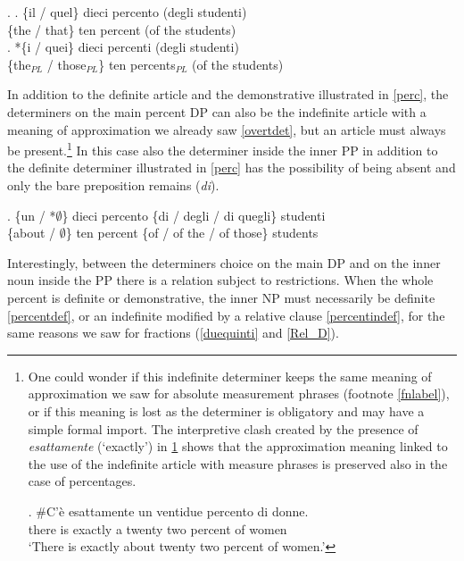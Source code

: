 \documentclass[charis, linguex]{glossa}
\begin{document}
\ex. \label{percnoagree} \ag. \{il / quel\} dieci percento (degli studenti) \\
      \{the / that\} ten percent ({of the} students) \\ \label{perc}
    \bg. *\{i / quei\} dieci percenti (degli studenti) \\
       \{the$_{PL}$ / those$_{PL}$\}  ten percents$_{PL}$ ({of the} students) \\ \label{noagree}
	   
In addition to the definite article and the demonstrative illustrated in \ref{perc}, the determiners on the main percent DP can also be the indefinite article with a meaning of approximation we already saw \ref{overtdet}, but an article must always be present.\footnote{One could wonder if this indefinite determiner keeps the same meaning of approximation we saw for absolute measurement phrases (footnote \ref{fnlabel}), or if this meaning is lost as the determiner is obligatory and may have a simple formal import.  The interpretive clash created by the presence of \textit{esattamente} (`exactly') in \ref{ventidue} shows that the approximation meaning linked to the use of the indefinite article with measure phrases is preserved also in the case of percentages. 

\exg. \#C'\`{e} esattamente un ventidue percento di donne.\\
         {there is} exactly a {twenty two} percent of women\\ \label{ventidue}
 \glt `There is exactly about twenty two percent of women.'
	
	} In this case also the determiner inside the inner PP in addition to the definite determiner illustrated in \ref{perc} has the possibility of being absent and only the bare preposition remains (\textit{di}). 

\exg. \{un / *$\emptyset$\} dieci percento \{di / degli / di quegli\} studenti \\
      \{about / $\emptyset$\}  ten   percent  \{of / {of the} / of those\} students \\ \label{overtdet}



Interestingly, between the determiners choice on the main DP and on the inner noun inside the PP there is a relation subject to restrictions. When the whole percent is definite or demonstrative, the inner NP must necessarily be definite \ref{percentdef}, or an indefinite modified by a relative clause  \ref{percentindef}, for the same reasons we saw for fractions (\ref{duequinti} and \ref{Rel_D}). 
\end{document}
